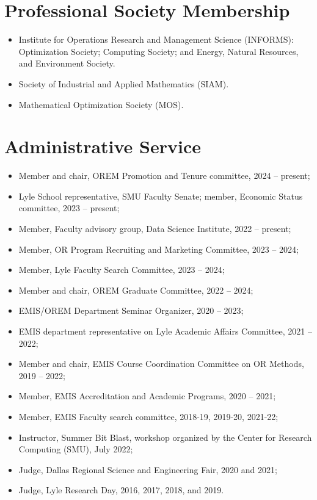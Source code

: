 \documentclass[hyperref, margin]{myResume}
\begin{document}
\begin{resume}
\section{Professional Society Membership}
		\begin{itemize}[leftmargin=1em]
			\item Institute for Operations Research and Management Science (INFORMS): Optimization Society; Computing Society; and Energy, Natural Resources, and Environment Society.
			\item Society of Industrial and Applied Mathematics (SIAM).
			\item Mathematical Optimization Society (MOS).
		\end{itemize}
	
\section{Administrative Service}
	\begin{itemize}[leftmargin=*]
		\item Member and chair, OREM Promotion and Tenure committee, 2024 -- present;
		\item Lyle School representative, SMU Faculty Senate; member, Economic Status committee, 2023 -- present;
		\item Member, Faculty advisory group, Data Science Institute, 2022 -- present;
		\item Member, OR Program Recruiting and Marketing Committee, 2023 -- 2024;
		\item Member, Lyle Faculty Search Committee, 2023 -- 2024;
		\item Member and chair, OREM Graduate Committee, 2022 -- 2024;
		\item EMIS/OREM Department Seminar Organizer, 2020 -- 2023;
		\item EMIS department representative on Lyle Academic Affairs Committee, 2021 -- 2022;
		\item Member and chair, EMIS Course Coordination Committee on OR Methods, 2019 -- 2022;
		\item Member, EMIS Accreditation and Academic Programs, 2020 -- 2021;
		\item Member, EMIS Faculty search committee, 2018-19, 2019-20, 2021-22;
		\item Instructor, Summer Bit Blast, workshop organized by the Center for Research Computing (SMU), July 2022;
		\item Judge, Dallas Regional Science and Engineering Fair, 2020 and 2021;
		\item Judge, Lyle Research Day, 2016, 2017, 2018, and 2019.
	\end{itemize}
	

\end{resume}
\end{document}

